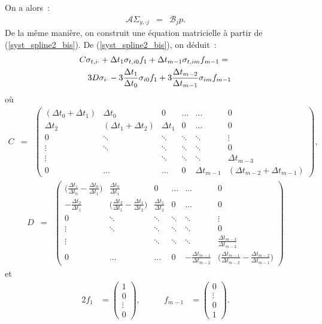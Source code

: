 \setlength{\fboxsep}{3pt}
\setcounter{MaxMatrixCols}{10}
On a alors~:
\begin{eqnarray}
\mathcal{A} \Sigma_{y,\cdot j} &=& \mathcal{B}_j p. 
\label{lineaire1_p}
\end{eqnarray}
De la m\^eme mani\`ere, on construit une \'equation matricielle \`a 
partir de (\ref{syst_spline2_bis}). De (\ref{syst_spline2_bis}), on 
d\'eduit~: 
\begin{eqnarray}
\lefteqn{C\sigma_{t,i \cdot} + \Delta t_1 \sigma_{t,i0}f_1 + 
\Delta t_{m-1}\sigma_{t,im}f_{m-1}=}\nonumber \\
&& 3D\sigma_{i \cdot}-3\frac{\Delta t_1}{\Delta t_0}\sigma_{i0}f_1 + 
3\frac{\Delta t_{m-2}}{\Delta t_{m-1}}\sigma_{im}f_{m-1}
\end{eqnarray}
o\`u 
\begin{eqnarray*}
C &=& \begin{pmatrix}
(\Delta t_0 + \Delta t_1) & \Delta t_0 & 0 & \ldots & \ldots & 0 \\
\Delta t_2 & (\Delta t_1+\Delta t_2) &\Delta t_1 & 0 & \ldots & 0 \\
0 & \ddots & \ddots & \ddots & \ddots & \vdots \\
\vdots & \ddots & \ddots & \ddots & \ddots & 0 \\
\vdots &  & \ddots & \ddots & \ddots & \Delta t_{m-3}\\
0 & \ldots & \ldots & 0 & \Delta t_{m-1} & (\Delta t_{m-2}+
\Delta t_{m-1})
\end{pmatrix},
\end{eqnarray*}
\begin{eqnarray*}
D &=& \begin{pmatrix}
\biggl ( \frac{\Delta t_1}{\Delta t_0}-\frac{\Delta t_0}
{\Delta t_1}\biggr ) & \frac{\Delta t_0}{\Delta t_1} & 0 
& \ldots & \ldots & 0 \\
-\frac{\Delta t_2}{\Delta t_1} & \biggl 
( \frac{\Delta t_2}{\Delta t_1}-\frac{\Delta t_1}{\Delta t_2}\biggr ) 
& \frac{\Delta t_1}{\Delta t_2} & 0 & \ldots & 0 \\
0 & \ddots & \ddots & \ddots & \ddots & \vdots \\
\vdots & \ddots & \ddots & \ddots & \ddots & 0 \\
\vdots &  & \ddots & \ddots & \ddots & 
\frac{\Delta t_{m-3}}{\Delta t_{m-2}}\\
0 & \ldots & \ldots & 0 & -\frac{\Delta t_{m-1}}{\Delta t_{m-2}} & 
\biggl ( \frac{\Delta t_{m-1}}{\Delta t_{m-2}}
-\frac{\Delta t_{m-2}}
{\Delta t_{m-1}}\biggr )
\end{pmatrix}
\end{eqnarray*}
et
\begin{alignat*}{2}
f_1 &= \begin{pmatrix} 1\\0\\ \vdots \\0 \end{pmatrix}, 
&\qquad f_{m-1} &= \begin{pmatrix} 0\\ \vdots \\0\\1 \end{pmatrix}.
\end{alignat*}

